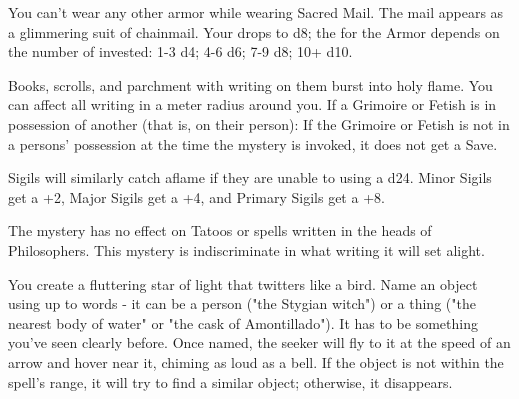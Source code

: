 {\MYSTERY [
  Name = Sacred Mail,
  Link = arcana-mystery-sacred-mail,
  Paradigm = Force,
  Save = n/a,
  Duration = Session,
  Target = Self
]

You can't wear any other armor while wearing Sacred Mail.  The mail appears as a glimmering suit of chainmail.  Your \MD drops to d8; the \UD for the Armor depends on the number of \DICE invested:  1-3 d4; 4-6 d6; 7-9 d8; 10+ d10.

\MYSTERY [
  Name = Satanic Verses,
  Link = arcana-mystery-satanic-verses,
  Paradigm = Entropy,
  Save = See Below,
  Duration = Instant,
  Target = Close
]

Books, scrolls, and parchment with writing on them burst into holy flame.  You can affect all writing in a \DICE meter radius around you.  If a Grimoire or Fetish is in possession of another (that is, on their person):
If the Grimoire or Fetish is not in a persons' possession at the time the mystery is invoked, it does not get a Save.

Sigils will similarly catch aflame if they are unable to \RS using a d24.  Minor Sigils get a +2, Major Sigils get a +4, and Primary Sigils get a +8.  

The mystery has no effect on Tatoos or spells written in the heads of Philosophers.  This mystery is indiscriminate in what writing it will set alight.


\MYSTERY [
  Name = Sonorous Seeker,
  Link = arcana-mystery-sonorous-seeker,
  Paradigm = Prophesy,
  Save = N,
  Duration = \SUM Minutes,
  Target = See Below
]

You create a fluttering star of light that twitters like a bird.  Name an object using up to \DICE words - it can be a person ("the Stygian witch") or a thing ("the nearest body of water" or "the cask of Amontillado").  It has to be something you've seen clearly before.  Once named, the seeker will fly to it at the speed of an arrow and hover near it, chiming as loud as a bell.  If the object is not within the spell's range, it will try to find a similar object; otherwise, it disappears.

}
